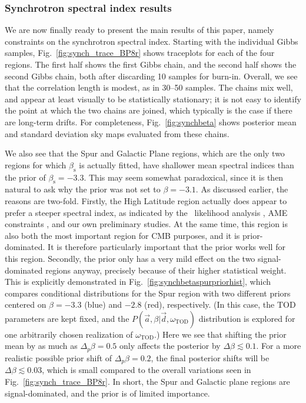 \documentclass[twocolumn]{aa}
\renewcommand{\d}[0]{\vec{d}}
\renewcommand{\a}[0]{\vec{a}}
\newcommand{\?}[1]{\textcolor{red}{{\bf [#1]}}}
\begin{document}
\subsubsection{Synchrotron spectral index results}
\label{sec:synch_beta}

We are now finally ready to present the main results of this paper,
namely constraints on the synchrotron spectral index. Starting with
the individual Gibbs samples, Fig.~\ref{fig:synch_trace_BP8r} shows
traceplots for each of the four regions. The first half shows the
first Gibbs chain, and the second half shows the second Gibbs chain,
both after discarding 10 samples for burn-in. Overall, we see that the
correlation length is modest, as in 30--50 samples. The chains mix
well, and appear at least visually to be statistically stationary; it
is not easy to identify the point at which the two chains are joined,
which typically is the case if there are long-term drifts. For
completeness, Fig.~\ref{fig:synchbeta} shows posterior mean and
standard deviation sky maps evaluated from these chains.

We also see that the Spur and Galactic Plane regions, which are the
only two regions for which $\beta_{\mathrm{s}}$ is actually fitted,
have shallower mean spectral indices than the prior of
$\beta_{\mathrm{s}}=-3.3$. This may seem somewhat paradoxical, since
it is then natural to ask why the prior was not set to
$\beta=-3.1$. As discussed earlier, the reasons are two-fold. Firstly,
the High Latitude region actually does appear to prefer a steeper
spectral index, as indicated by the \Planck\ likelihood analysis
\citep{planck2016-l05}, AME constraints \citep{bp15}, and our own
preliminary studies. At the same time, this region is also both the
most important region for CMB purposes, and it is prior-dominated. It
is therefore particularly important that the prior works well for this
region. Secondly, the prior only has a very mild effect on the two
signal-dominated regions anyway, precisely because of their higher
statistical weight. This is explicitly demonstrated in
Fig.~\ref{fig:synchbetaspurpriorhist}, which compares
conditional distributions for the Spur region with two different
priors centered on $\beta=-3.3$ (blue) and $-2.8$ (red),
respectively. (In this case, the TOD parameters are kept fixed, and
the $P(\a,\beta|\d, \omega_{\mathrm{TOD}})$ distribution is explored
for one arbitrarily chosen realization of $\omega_{\mathrm{TOD}}$.)
Here we see that shifting the prior mean by as much as
$\Delta_p\beta=0.5$ only affects the posterior by
$\Delta\beta\lesssim0.1$. For a more realistic possible prior shift of
$\Delta_p\beta=0.2$, the final posterior shifts will be
$\Delta\beta\lesssim0.03$, which is small compared to the overall
variations seen in Fig.~\ref{fig:synch_trace_BP8r}. In short, the Spur
and Galactic plane regions are signal-dominated, and the prior is of
limited importance.
\end{document}
